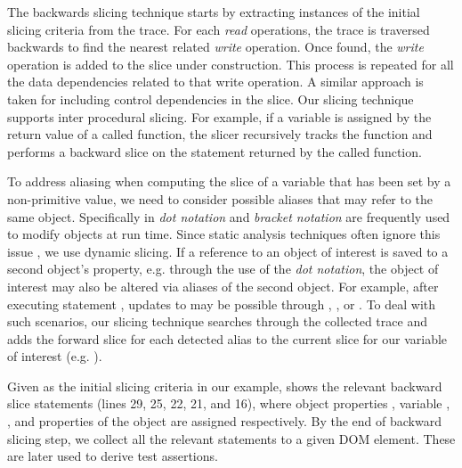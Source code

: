 The backwards slicing technique starts by extracting instances of the initial slicing criteria from the trace. For each \textit{read} operations, the trace is traversed backwards to find the nearest related \textit{write} operation. Once found, the \textit{write} operation is added to the slice under construction. This process is repeated for all the data dependencies related to that write operation. A similar approach is taken for including control dependencies in the slice. 
Our slicing technique supports inter procedural slicing. For example, if a variable is assigned by the return value of a called function, the slicer recursively tracks the function and performs a backward slice on the statement returned by the called function.
  
To address aliasing when computing the slice of a variable that has been set by a non-primitive value, we need to consider possible aliases that may refer to the same object. Specifically in \javascript \textit{dot notation} and \textit{bracket notation} are frequently used to modify objects at run time. Since static analysis techniques often ignore this issue \cite{Feldthaus:icse13}, we use dynamic slicing. If a reference to an object of interest is saved to a second object's property, e.g. through the use of the \textit{dot notation}, the object of interest may also be altered via aliases of the second object. For example, after executing statement , updates to  may be possible through , , or . To deal with such scenarios, our slicing technique searches through the collected trace and adds the forward slice for each detected alias to the current slice for our variable of interest (e.g. ). 

Given  as the initial slicing criteria in our example,  shows the relevant backward slice statements (lines 29, 25, 22, 21, and 16), where object properties , variable , , and properties of the object  are assigned respectively.
By the end of backward slicing step, we collect all the relevant statements to a given DOM element. These are later used to derive test assertions.    